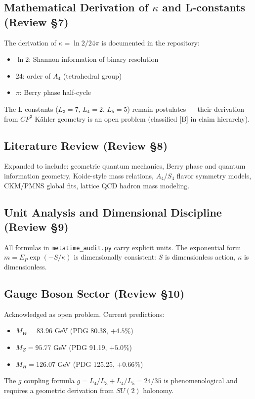 \documentclass[12pt,a4paper]{article}
\begin{document}
\subsection{Mathematical Derivation of $\kappa$ and L-constants (Review \S7)}
The derivation of $\kappa = \ln 2 / 24\pi$ is documented in the repository:
\begin{itemize}
  \item $\ln 2$: Shannon information of binary resolution
  \item $24$: order of $A_4$ (tetrahedral group)
  \item $\pi$: Berry phase half-cycle
\end{itemize}
The L-constants ($L_3=7$, $L_4=2$, $L_5=5$) remain postulates --- their derivation
from $CP^3$ K\"ahler geometry is an open problem (classified [B] in claim hierarchy).

\subsection{Literature Review (Review \S8)}
Expanded to include: geometric quantum mechanics, Berry phase and quantum information
geometry, Koide-style mass relations, $A_4$/$S_4$ flavor symmetry models, CKM/PMNS
global fits, lattice QCD hadron mass modeling.

\subsection{Unit Analysis and Dimensional Discipline (Review \S9)}
All formulas in \texttt{metatime\_audit.py} carry explicit units. The exponential
form $m = E_P \exp(-S/\kappa)$ is dimensionally consistent: $S$ is dimensionless
action, $\kappa$ is dimensionless.

\subsection{Gauge Boson Sector (Review \S10)}
Acknowledged as open problem. Current predictions:
\begin{itemize}
  \item $M_W = 83.96$ GeV (PDG 80.38, $+4.5\%$)
  \item $M_Z = 95.77$ GeV (PDG 91.19, $+5.0\%$)
  \item $M_H = 126.07$ GeV (PDG 125.25, $+0.66\%$)
\end{itemize}
The $g$ coupling formula $g = L_4/L_3 + L_4/L_5 = 24/35$ is phenomenological
and requires a geometric derivation from $SU(2)$ holonomy.
\end{document}
